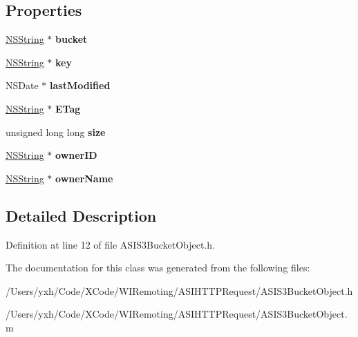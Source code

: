 \subsection*{Properties}
\begin{DoxyCompactItemize}
\item 
\hypertarget{interface_a_s_i_s3_bucket_object_afa43e302ea97b1d6c9a939afd39fa581}{
\hyperlink{class_n_s_string}{NSString} $\ast$ {\bfseries bucket}}
\label{interface_a_s_i_s3_bucket_object_afa43e302ea97b1d6c9a939afd39fa581}

\item 
\hypertarget{interface_a_s_i_s3_bucket_object_acb2fc8708e6be84aac4625df1ec682d1}{
\hyperlink{class_n_s_string}{NSString} $\ast$ {\bfseries key}}
\label{interface_a_s_i_s3_bucket_object_acb2fc8708e6be84aac4625df1ec682d1}

\item 
\hypertarget{interface_a_s_i_s3_bucket_object_ab69cd89e05e8578910c8b6fd7aca5338}{
NSDate $\ast$ {\bfseries lastModified}}
\label{interface_a_s_i_s3_bucket_object_ab69cd89e05e8578910c8b6fd7aca5338}

\item 
\hypertarget{interface_a_s_i_s3_bucket_object_a3978c70e98e2e238a0f0f26dde6f68be}{
\hyperlink{class_n_s_string}{NSString} $\ast$ {\bfseries ETag}}
\label{interface_a_s_i_s3_bucket_object_a3978c70e98e2e238a0f0f26dde6f68be}

\item 
\hypertarget{interface_a_s_i_s3_bucket_object_a48983b66aaf050a10fa2308e022bb0fd}{
unsigned long long {\bfseries size}}
\label{interface_a_s_i_s3_bucket_object_a48983b66aaf050a10fa2308e022bb0fd}

\item 
\hypertarget{interface_a_s_i_s3_bucket_object_a75c3c576737c90804e45ed93d1a7282a}{
\hyperlink{class_n_s_string}{NSString} $\ast$ {\bfseries ownerID}}
\label{interface_a_s_i_s3_bucket_object_a75c3c576737c90804e45ed93d1a7282a}

\item 
\hypertarget{interface_a_s_i_s3_bucket_object_ad694311630ade9eebe4e203d840a7709}{
\hyperlink{class_n_s_string}{NSString} $\ast$ {\bfseries ownerName}}
\label{interface_a_s_i_s3_bucket_object_ad694311630ade9eebe4e203d840a7709}

\end{DoxyCompactItemize}


\subsection{Detailed Description}


Definition at line 12 of file ASIS3BucketObject.h.

The documentation for this class was generated from the following files:\begin{DoxyCompactItemize}
\item 
/Users/yxh/Code/XCode/WIRemoting/ASIHTTPRequest/ASIS3BucketObject.h\item 
/Users/yxh/Code/XCode/WIRemoting/ASIHTTPRequest/ASIS3BucketObject.m\end{DoxyCompactItemize}
